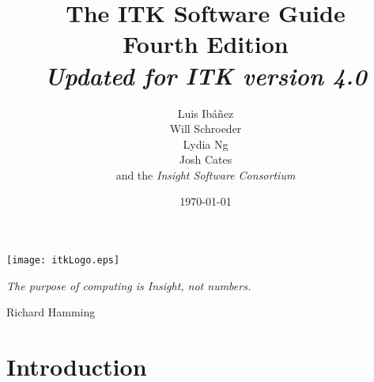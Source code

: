 \documentclass{InsightSoftwareGuide}
\title{The ITK Software Guide\\Fourth Edition\\ \emph{Updated for ITK version 4.0}}
\author{Luis Ib\'{a}\~{n}ez\\Will Schroeder\\Lydia Ng\\Josh Cates\\
and the \emph{Insight Software Consortium}}
\date{\today}
\newif\ifitkFullVersion
\begin{document}
\ifitkPrintedVersion

\fi

\maketitle

\frontmatter




%
%
\cleardoublepage

\begin{minipage}[t][10cm][b]{\textwidth}
\center
\texttt{[image: itkLogo.eps]}
\large
\begin{center}
\emph{The purpose of computing is Insight, not numbers.}\\
\end{center}
\hspace{8cm} Richard Hamming
\normalsize
\end{minipage}



%
\pagestyle{plain}
%



\ifitkPrintedVersion

\fi

\ifitkFullVersion


\fi



%
%


%
\pagestyle{normal}
%
\small
\tableofcontents
\listoffigures
\listoftables
\normalsize




%
%

\mainmatter

\part{Introduction}
\end{document}
